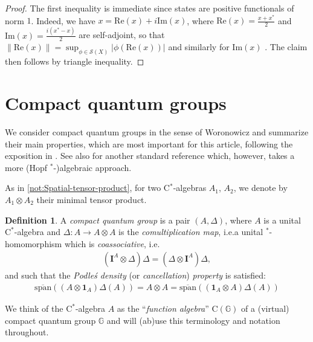 \documentclass{amsart}
\theoremstyle{plain}
\theoremstyle{definition}
\newtheorem{definition}[theorem]{Definition}
\theoremstyle{remark}
\renewcommand{\Re}{\text{Re}}
\renewcommand{\Im}{\text{Im}}
\begin{document}
	\begin{proof}
		The first inequality is immediate since states are positive functionals of norm $1$.
		Indeed, we have $x = \Re(x) + i\Im(x)$, where $\Re(x) = \frac{x+x^*}{2}$ and $\Im(x) = \frac{i(x^*-x)}{2}$ are self-adjoint, so that $\lVert\Re(x)\rVert = \sup_{\phi \in \mathcal{S}(X)} |\phi(\Re(x))|$ and similarly for $\Im(x)$ \cite[Theorem 4.3.9]{KR1}.
		The claim then follows by triangle inequality.
	\end{proof}
	
	
	
	\section{Compact quantum groups}\label{sec:Compact-quantum-groups}
	
	We consider compact quantum groups in the sense of Woronowicz \cite{Wor98} and summarize their main properties, which are most important for this article, following the exposition in \cite{NT13}.
	See also \cite{KS97} for another standard reference which, however, takes a more (Hopf $^*$-)algebraic approach.
	
	As in \autoref{not:Spatial-tensor-product}, for two C$^*$-algebras $A_1$, $A_2$, we denote by $A_1 \otimes A_2$ their minimal tensor product.
	
	\begin{definition}
		A \emph{compact quantum group} is a pair $(A,\Delta)$, where $A$ is a unital $\mathrm{C}^*$-algebra and $\Delta : A \rightarrow A \otimes A$ is the \emph{comultiplication map}, i.e.\@ a unital $^*$-homomorphism which is \emph{coassociative}, i.e.
		\begin{align}
			(\mathbf{I}^A \otimes \Delta)\Delta = (\Delta \otimes \mathbf{I}^A)\Delta,
		\end{align} 
		and such that the \emph{Podleś density} (or \emph{cancellation}) \emph{property} is satisfied:
		\begin{align}
			\overline{\mathrm{span}}((A \otimes \mathbf{1}_A) \Delta(A)) = A \otimes A = \overline{\mathrm{span}}((\mathbf{1}_A \otimes A) \Delta(A))
		\end{align}
	\end{definition}
	
	We think of the $\mathrm{C}^*$-algebra $A$ as the ``\emph{function algebra}'' $\mathrm{C}(\mathbb{G})$ of a (virtual) compact quantum group $\mathbb{G}$ and will (ab)use this terminology and notation throughout.
	
\end{document}
